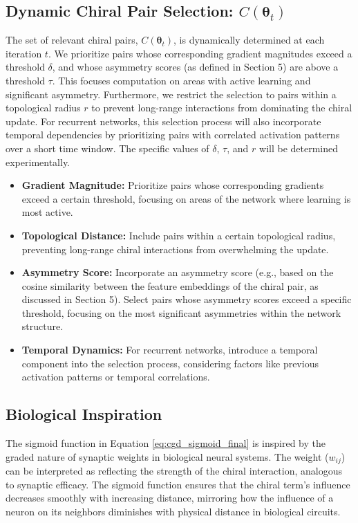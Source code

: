 \documentclass[12pt, a4paper]{article}
\begin{document}
\subsection{Dynamic Chiral Pair Selection: \(C(\boldsymbol{\theta}_t)\)}

The set of relevant chiral pairs, \(C(\boldsymbol{\theta}_t)\), is dynamically determined at each iteration $t$.  We prioritize pairs whose corresponding gradient magnitudes exceed a threshold $\delta$, and whose asymmetry scores (as defined in Section 5) are above a threshold $\tau$. This focuses computation on areas with active learning and significant asymmetry.  Furthermore, we restrict the selection to pairs within a topological radius $r$ to prevent long-range interactions from dominating the chiral update.  For recurrent networks, this selection process will also incorporate temporal dependencies by prioritizing pairs with correlated activation patterns over a short time window. The specific values of  $\delta$, $\tau$, and $r$  will be determined experimentally.

\begin{itemize}
\item \textbf{Gradient Magnitude:} Prioritize pairs whose corresponding gradients exceed a certain threshold, focusing on areas of the network where learning is most active.
\item \textbf{Topological Distance:} Include pairs within a certain topological radius, preventing long-range chiral interactions from overwhelming the update.
\item \textbf{Asymmetry Score:} Incorporate an asymmetry score (e.g., based on the cosine similarity between the feature embeddings of the chiral pair, as discussed in Section 5). Select pairs whose asymmetry scores exceed a specific threshold, focusing on the most significant asymmetries within the network structure.
\item \textbf{Temporal Dynamics:} For recurrent networks, introduce a temporal component into the selection process, considering factors like previous activation patterns or temporal correlations.
\end{itemize}

\subsection{Biological Inspiration}

The sigmoid function in Equation \ref{eq:cgd_sigmoid_final} is inspired by the graded nature of synaptic weights in biological neural systems. The weight ($w_{ij}$) can be interpreted as reflecting the strength of the chiral interaction, analogous to synaptic efficacy. The sigmoid function ensures that the chiral term's influence decreases smoothly with increasing distance, mirroring how the influence of a neuron on its neighbors diminishes with physical distance in biological circuits.
 
\end{document}
